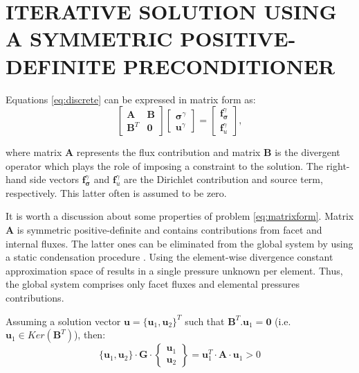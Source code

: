 \documentclass{wccm2024}
\begin{document}
\section{ITERATIVE SOLUTION USING A SYMMETRIC POSITIVE-DEFINITE PRECONDITIONER}

Equations \eqref{eq:discrete} can be expressed in matrix form as:
\vskip -0.3cm
\begin{equation} \label{eq:matrixform}
    \begin{bmatrix}
        \mathbf{A} & \mathbf{B} \\
        \mathbf{B}^T & \mathbf{0}
    \end{bmatrix}
    \begin{bmatrix}
        \boldsymbol{\sigma}^\gamma \\
        \mathbf{u}^\gamma
    \end{bmatrix}
    =
    \begin{bmatrix}
        \mathbf{f}^\gamma_{\boldsymbol{\sigma}} \\
        \mathbf{f}^\gamma_{u}
    \end{bmatrix},
\end{equation}

\noindent where matrix $\mathbf{A}$ represents the flux contribution and matrix $\mathbf{B}$ is the divergent operator which plays the role of imposing a constraint to the solution. The right-hand side vectors $\mathbf{f}^\gamma_{\boldsymbol{\sigma}}$ and $\mathbf{f}^\gamma_{u}$ are the Dirichlet contribution and source term, respectively. This latter often is assumed to be zero.

It is worth a discussion about some properties of problem \eqref{eq:matrixform}. Matrix $\mathbf{A}$ is symmetric positive-definite and contains contributions from facet and internal fluxes. The latter ones can be eliminated from the global system by using a static condensation procedure \cite{guyan1965reduction}. Using the element-wise divergence constant approximation space of \cite{devloo2022efficient} results in a single pressure unknown per element. Thus, the global system comprises only facet fluxes and elemental pressures contributions.

Assuming a solution vector $\mathbf{u}=\{\mathbf{u}_1, \mathbf{u}_2\}^T$ such that $\mathbf{B}^T . \mathbf{u}_1 = \mathbf{0}$ (i.e. $\mathbf{u}_1 \in Ker\left( \mathbf{B}^T \right)$), then:
\vskip -0.3cm
\begin{equation}
    \{\mathbf{u}_1, \mathbf{u}_2\} \cdot \mathbf{G} \cdot 
    \begin{Bmatrix}
        \mathbf{u}_1 \\
        \mathbf{u}_2
    \end{Bmatrix}
    = \mathbf{u}_1^T \cdot \mathbf{A} \cdot \mathbf{u}_1 > 0
\end{equation}
\end{document}
